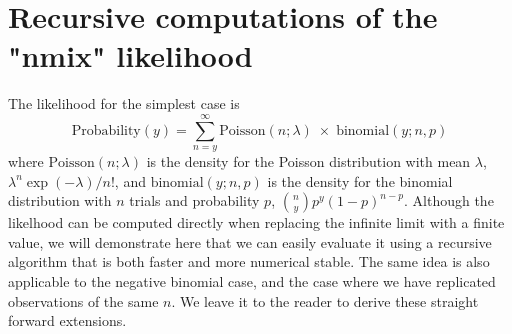 \documentclass[article]{jss}
\begin{document}
\section{Recursive computations of the "nmix" likelihood}
The likelihood for the simplest case is
\begin{displaymath}
    \text{Probability}(y) = \sum_{n = y}^{\infty}
    \text{Poisson}(n ; \lambda) \;\times\; \text{binomial}(y;  n, p)
\end{displaymath}
where $\text{Poisson}(n; \lambda)$ is the density for the Poisson distribution with mean $\lambda$, $\lambda^{n}\exp(-\lambda)/n!$, and $\text{binomial}(y; n, p)$ is the density for the binomial distribution
with $n$ trials and probability $p$, ${n \choose y} p^{y}(1-p)^{n-p}$. Although the likelhood can be computed directly when replacing the infinite limit with a finite value, we will demonstrate here that we
can easily evaluate it using a recursive algorithm that is both faster and more numerical stable. The same idea is also applicable to the negative binomial case, and the case where we have replicated observations of the same $n$. We leave it to the reader to derive these straight forward extensions.
\end{document}
